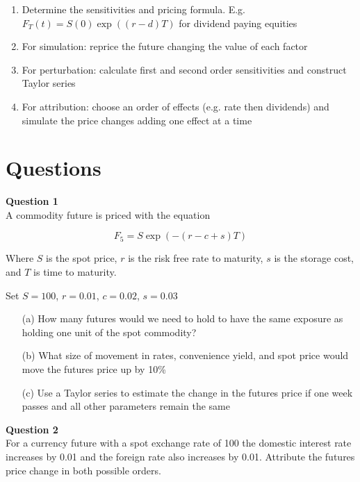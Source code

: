 \documentclass{tran-l}
\theoremstyle{definition}
\theoremstyle{remark}
\numberwithin{equation}{subsection}
\begin{document}
\begin{enumerate}
\item Determine the sensitivities and pricing formula. E.g. $F_T(t) = S(0)\exp((r-d)T)$ for dividend paying equities\\
\item For simulation: reprice the future changing the value of each factor\\
\item For perturbation: calculate first and second order sensitivities and construct Taylor series\\
\item For attribution: choose an order of effects (e.g. rate then dividends) and simulate the price changes adding one effect at a time\\
\end{enumerate}



\section{Questions}

\textbf{Question 1}\\

A commodity future is priced with the equation

\[F_5 = S \exp(-(r-c+s)T) \]

Where $S$ is the spot price, $r$ is the risk free rate to maturity, $s$ is the storage cost, and $T$ is time to maturity. 

Set $S = 100$, $r = 0.01$, $c = 0.02$, $s=0.03$

\begin{itemize}
\item[(a)] How many futures would we need to hold to have the same exposure as holding one unit of the spot commodity?
\item[(b)] What size of movement in rates, convenience yield, and spot price would move the futures price up by 10\%
\item[(c)] Use a Taylor series to estimate the change in the futures price if one week passes and all other parameters remain the same
\end{itemize}

\textbf{Question 2}\\

For a currency future with a spot exchange rate of 100 the domestic interest rate increases by 0.01 and the foreign rate also increases by 0.01. Attribute the futures price change in both possible orders. 


 
 
\end{document}
